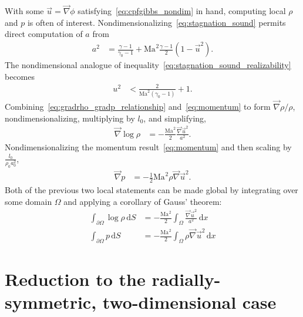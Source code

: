 \documentclass[letterpaper,11pt,nointlimits,reqno]{amsart}
\newcommand{\Mach}[1][]{\ensuremath{\mbox{Ma}_{#1}}}
\begin{document}
With some $\vec{u}=\vec{\nabla}\phi$ satisfying~\eqref{eq:cpfgibbs_nondim} in
hand, computing local $\rho$ and $p$ is often of interest.
Nondimensionalizing~\eqref{eq:stagnation_sound} permits direct computation of
$a$ from
\begin{align}
  a^2 &= \frac{\gamma-1}{\gamma_0-1}
       + \Mach^2\frac{\gamma-1}{2}\left(1-\vec{u}^2\right)
\label{eq:stagnation_sound_nondim}
.
\end{align}
The nondimensional analogue of
inequality~\eqref{eq:stagnation_sound_realizability} becomes
\begin{align}
  u^2 &< \frac{2}{\Mach^2\left(\gamma_0-1\right)} + 1
.
\label{eq:stagnation_sound_realizability_nondim}
\end{align}
Combining~\eqref{eq:gradrho_gradp_relationship} and~\eqref{eq:momentum} to form
$\vec{\nabla}\rho / \rho$, nondimensionalizing, multiplying by $l_0$, and
simplifying,
\begin{align}
  \vec{\nabla}\log\rho
  &=
  -\frac{\Mach^2}{2}\frac{\vec{\nabla}\vec{u}^2}{a^2}
.
\end{align}
Nondimensionalizing the momentum result~\eqref{eq:momentum} and then scaling by
$\frac{l_0}{\rho_0 a_0^2}$,
\begin{align}
  \vec{\nabla} p &= - \frac{1}{2}\Mach^2 \rho \vec{\nabla}\vec{u}^2
.
\end{align}
Both of the previous two local statements can be made global by integrating
over some domain $\Omega$ and applying a corollary of Gauss' theorem:
\begin{align}
  \int_{\partial\Omega} \log\rho \, \mathrm{d}S
  &=
  - \frac{\Mach^2}{2}\int_{\Omega}
    \frac{\vec{\nabla}\vec{u}^2}{a^2} \, \mathrm{d}x
\label{eq:logrho_nondim}
\\
  \int_{\partial\Omega} p \, \mathrm{d}S
  &=
  - \frac{\Mach^2}{2}\int_{\Omega} \rho \vec{\nabla}\vec{u}^2 \, \mathrm{d}x
\label{eq:p_nondim}
\end{align}

\section{Reduction to the radially-symmetric, two-dimensional case}
\end{document}
